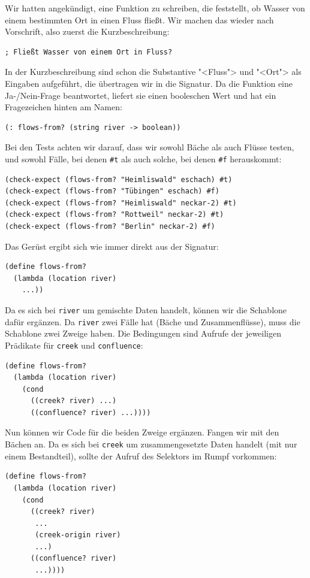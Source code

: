 Wir hatten angekündigt, eine Funktion zu schreiben, die feststellt, ob
Wasser von einem bestimmten Ort in einen Fluss fließt.  Wir machen das
wieder nach Vorschrift, also zuerst die Kurzbeschreibung:
%
\begin{lstlisting}
; Fließt Wasser von einem Ort in Fluss?
\end{lstlisting}
%
In der Kurzbeschreibung sind schon die Substantive "<Fluss"> und
"<Ort"> als Eingaben aufgeführt, die übertragen wir in die Signatur.
Da die Funktion eine Ja-/Nein-Frage beantwortet, liefert sie einen
booleschen Wert und hat ein Fragezeichen hinten am Namen:
%
\begin{lstlisting}
(: flows-from? (string river -> boolean))
\end{lstlisting}
%
Bei den Tests achten wir darauf, dass wir sowohl Bäche als auch Flüsse
testen, und sowohl Fälle, bei denen \lstinline{#t} als auch solche,
bei denen \lstinline{#f} herauskommt:
%
\begin{lstlisting}
(check-expect (flows-from? "Heimliswald" eschach) #t)
(check-expect (flows-from? "Tübingen" eschach) #f)
(check-expect (flows-from? "Heimliswald" neckar-2) #t)
(check-expect (flows-from? "Rottweil" neckar-2) #t)
(check-expect (flows-from? "Berlin" neckar-2) #f)
\end{lstlisting}
%
Das Gerüst ergibt sich wie immer direkt aus der Signatur:
%
\begin{lstlisting}
(define flows-from?
  (lambda (location river)
    ...))
\end{lstlisting}
%
Da es sich bei \lstinline{river} um gemischte Daten handelt, können
wir die Schablone dafür ergänzen.  Da \lstinline{river} zwei Fälle hat
(Bäche und Zusammenflüsse), muss die Schablone zwei Zweige haben.  Die
Bedingungen sind Aufrufe der jeweiligen Prädikate für
\lstinline{creek} und \lstinline{confluence}:
%
\begin{lstlisting}
(define flows-from?
  (lambda (location river)
    (cond
      ((creek? river) ...)
      ((confluence? river) ...))))
\end{lstlisting}
%
Nun können wir Code für die beiden Zweige ergänzen.  Fangen wir mit
den Bächen an.  Da es sich bei \lstinline{creek} um zusammengesetzte
Daten handelt (mit nur einem Bestandteil), sollte der Aufruf des
Selektors im Rumpf vorkommen:
%
\begin{lstlisting}
(define flows-from?
  (lambda (location river)
    (cond
      ((creek? river)
       ...
       (creek-origin river)
       ...)
      ((confluence? river)
       ...))))
\end{lstlisting}

